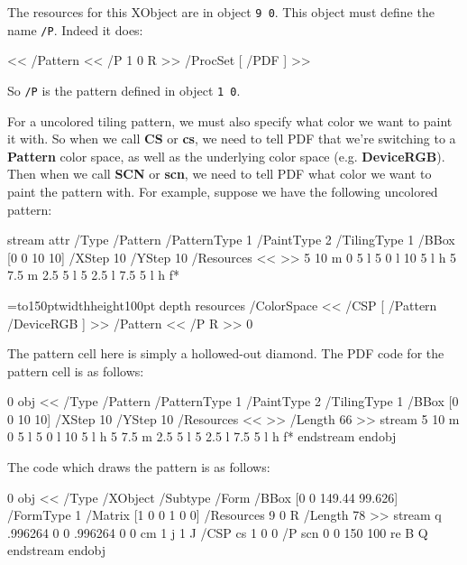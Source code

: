 \noindent The resources for this XObject are in object {\tt9 0}.
This object must define the name {\tt/P}.
Indeed it does:

\blisting
<<
    /Pattern << /P 1 0 R >> 
    /ProcSet [ /PDF ]
>>
\elisting

\noindent So {\tt/P} is the pattern defined in object {\tt1 0}.

For a uncolored tiling pattern, we must also specify what color we want to paint it with.
So when we call {\bf CS} or {\bf cs}, we need to tell PDF that we're switching to a {\bf Pattern} color space,
as well as the underlying color space (e.g. {\bf DeviceRGB}).
Then when we call {\bf SCN} or {\bf scn}, we need to tell PDF what color we want to paint the pattern with.
For example, suppose we have the following uncolored pattern:

\bigskip
\immediate\pdfobj stream attr{
    /Type /Pattern
    /PatternType 1
    /PaintType 2
    /TilingType 1
    /BBox [0 0 10 10] 
    /XStep 10
    /YStep 10
    /Resources << >>
}{
    5 10 m
    0 5 l 5 0 l 10 5 l h
    5 7.5 m
    2.5 5 l 5 2.5 l 7.5 5 l h
    f*
}

\bgroup{}=\hbox to150pt{\vrule width\z@ height100pt depth\z@%
\hfil}
\pdfxform resources{%
    /ColorSpace << /CSP [ /Pattern /DeviceRGB ] >>
    /Pattern << /P \the\pdflastobj{} R >>
}0
\centerline{\pdfrefxform\pdflastxform}\egroup
\bigskip

The pattern cell here is simply a hollowed-out diamond.
The PDF code for the pattern cell is as follows:

 0 obj
<<
    /Type /Pattern          %
    /PatternType 1          %
    /PaintType 2            %
    /TilingType 1           %
    /BBox [0 0 10 10]       %
    /XStep 10               %
    /YStep 10               %
    /Resources << >>        %
    /Length 66        
>>
stream
5 10 m
0 5 l 5 0 l 10 5 l h        %
5 7.5 m
2.5 5 l 5 2.5 l 7.5 5 l h   %
f*                          %
endstream
endobj
\elisting

\noindent The code which draws the pattern is as follows:

 0 obj
<<
    /Type /XObject
    /Subtype /Form
    /BBox [0 0 149.44 99.626]
    /FormType 1
    /Matrix [1 0 0 1 0 0]
    /Resources 9 0 R
    /Length 78        
>>
stream
q
.996264 0 0 .996264 0 0 cm      %
1 j 1 J                         %
/CSP cs                         %
1 0 0 /P scn                    %
0 0 150 100 re                  %
B                               %
Q 
endstream
endobj
\elisting

